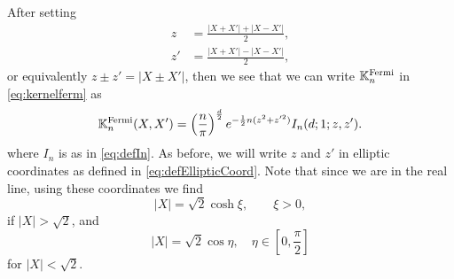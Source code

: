 \documentclass[%
 jmp,
cp,  %
 amsmath,amsthm,amssymb,%
 reprint,%
onecolumn]{revtex4-2}
\begin{document}
After setting 
\begin{align*}
z &= \frac{\lvert X+X' \rvert + \lvert X-X' \rvert}{2},\\
z' &= \frac{\lvert X+X' \rvert - \lvert X-X' \rvert}{2},
\end{align*}
or equivalently $z\pm z'=|X\pm X'|$, then we see that we can write $\mathbb K_n^{\rm Fermi}$ in \eqref{eq:kernelferm} as 
\begin{equation}\label{eq:fermionsKnI}
\mathbb K_n^{\rm Fermi}(X,X') 
= \left(\frac{n}{\pi}\right)^\frac{d}{2} e^{-\frac{1}{2} n (z^2+z'^2)} I_n(d;1;z,z'). 
\end{equation}
where $I_n$ is as in \eqref{eq:defIn}.
 As before, we will write $z$ and $z'$ in elliptic coordinates as defined in \eqref{eq:defEllipticCoord}.  Note that since we are in the real line, using these coordinates we find  
 $$
   \lvert X\rvert = 
        \sqrt 2 \cosh \xi, \qquad \xi>0, $$
if $\lvert X\rvert>\sqrt 2$, and 
$$
\lvert X\rvert =    \sqrt 2 \cos \eta, \quad \eta \in[0,\frac{\pi}{2}]
 $$
 for  $\lvert X\rvert<\sqrt 2$.
\end{document}
